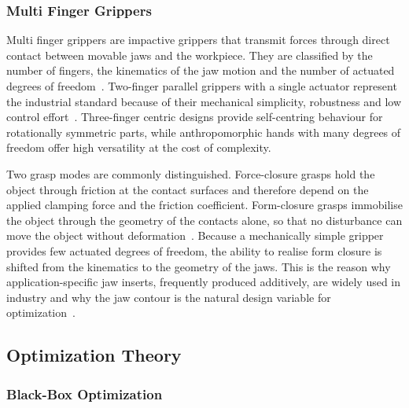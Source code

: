 \subsubsection{Multi Finger Grippers}
\label{subsubsec:multi_finger_grippers}

Multi finger grippers are impactive grippers that transmit forces through direct contact between movable jaws and the workpiece. They are classified
by the number of fingers, the kinematics of the jaw motion and the number of actuated degrees of freedom~\cite{Khalid2025Design}. Two-finger parallel
grippers with a single actuator represent the industrial standard because of their mechanical simplicity, robustness and low control
effort~\cite{Ciocarlie2014The}. Three-finger centric designs provide self-centring behaviour for rotationally symmetric parts, while anthropomorphic
hands with many degrees of freedom offer high versatility at the cost of complexity.

Two grasp modes are commonly distinguished. Force-closure grasps hold the object through friction at the contact surfaces and therefore depend on the
applied clamping force and the friction coefficient. Form-closure grasps immobilise the object through the geometry of the contacts alone, so that no
disturbance can move the object without deformation~\cite{Bicchi1995On}. Because a mechanically simple gripper provides few actuated degrees of
freedom, the ability to realise form closure is shifted from the kinematics to the geometry of the jaws. This is the reason why application-specific
jaw inserts, frequently produced additively, are widely used in industry and why the jaw contour is the natural design variable for
optimization~\cite{Gebauer2024Uncertainty-integrating}.


\subsection{Optimization Theory}
\label{subsec:optimization_theory}

\subsubsection{Black-Box Optimization}
\label{subsubsec:black_box_optimization}

